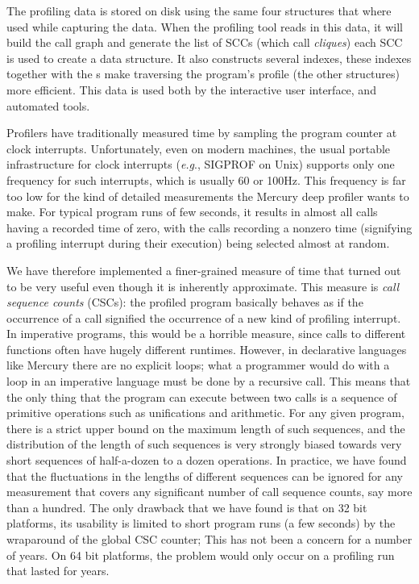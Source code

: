 \noindent
The profiling data is stored on disk using the same four structures that
where used while capturing the data.
When the profiling tool reads in this data,
it will build the call graph and generate the list of SCCs
(which \citet{conway:2001:mercury-deep} call \emph{cliques})
each SCC is used to create a \Clique data structure.
It also constructs several indexes,
these indexes together with the {\Clique}s make traversing the program's
profile (the other structures) more efficient.
This data is used both by
the interactive user interface,
and automated tools.

Profilers have traditionally measured time
by sampling the program counter at clock interrupts.
Unfortunately, even on modern machines,
the usual portable infrastructure for clock interrupts
(\emph{e.g}., SIGPROF on Unix)
supports only one frequency for such interrupts,
which is usually 60 or 100Hz.
This frequency is far too low for the kind of detailed measurements
the Mercury deep profiler wants to make.
For typical program runs of few seconds,
it results in almost all calls having a recorded time of zero,
with the calls recording a nonzero time
(signifying a profiling interrupt during their execution)
being selected almost at random.

We have therefore implemented a finer-grained measure of time
that turned out to be very useful
even though it is inherently approximate.
This measure is \emph{call sequence counts} (CSCs):
the profiled program basically behaves
as if the occurrence of a call signified
the occurrence of a new kind of profiling interrupt.
In imperative programs, this would be a horrible measure,
since calls to different functions often have hugely different runtimes.
However, in declarative languages like Mercury there are no explicit loops;
what a programmer would do with a loop in an imperative language
must be done by a recursive call.
This means that the only thing that the program can execute between two calls
is a sequence of primitive operations such as unifications and arithmetic.
For any given program,
there is a strict upper bound on the maximum length of such sequences,
and the distribution of the length of such sequences
is very strongly biased towards very short sequences
of half-a-dozen to a dozen operations.
In practice, we have found that
the fluctuations in the lengths of different sequences
can be ignored for any measurement
that covers any significant number of call sequence counts,
say more than a hundred.
The only drawback that we have found is that on 32 bit platforms,
its usability is limited to short program runs (a few seconds)
by the wraparound of the global CSC counter;
This has not been a concern for a number of years.
On 64 bit platforms, the problem would only occur
on a profiling run that lasted for years.

